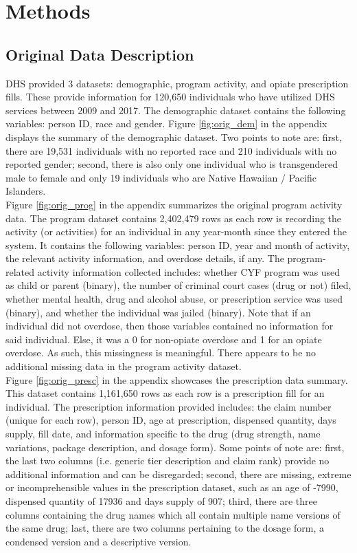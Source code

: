 \documentclass[twoside,10.5pt]{article}
\begin{document}
\section{Methods}
\subsection{Original Data Description}
DHS provided 3 datasets: demographic, program activity, and opiate prescription fills. These provide information for 120,650 individuals who have utilized DHS services between 2009 and 2017. The demographic dataset contains the following variables: person ID, race and gender. Figure \ref{fig:orig_dem} in the appendix displays the summary of the demographic dataset. Two points to note are: first, there are 19,531 individuals with no reported race and 210 individuals with no reported gender; second, there is also only one individual who is transgendered male to female and only 19 individuals who are Native Hawaiian / Pacific Islanders. \\

Figure \ref{fig:orig_prog} in the appendix summarizes the original program activity data. The program dataset contains 2,402,479 rows as each row is recording the activity (or activities) for an individual in any year-month since they entered the system. It contains the following variables: person ID, year and month of activity, the relevant activity information, and overdose details, if any. The program-related activity information collected includes: whether CYF program was used as child or parent (binary), the number of criminal court cases (drug or not) filed, whether mental health, drug and alcohol abuse, or prescription service was used (binary), and whether the individual was jailed (binary). Note that if an individual did not overdose, then those variables contained no information for said individual. Else, it was a 0 for non-opiate overdose and 1 for an opiate overdose. As such, this missingness is meaningful. There appears to be no additional missing data in the program activity dataset. \\

Figure \ref{fig:orig_presc} in the appendix showcases the prescription data summary. This dataset contains 1,161,650 rows as each row is a prescription fill for an individual. The prescription information provided includes: the claim number (unique for each row), person ID, age at prescription, dispensed quantity, days supply, fill date, and information specific to the drug (drug strength, name variations, package description, and dosage form). Some points of note are: first, the last two columns (i.e. generic tier description and claim rank) provide no additional information and can be disregarded; second, there are missing, extreme or incomprehensible values in the prescription dataset, such as an age of -7990, dispensed quantity of 17936 and days supply of 907; third, there are three columns containing the drug names which all contain multiple name versions of the same drug; last, there are two columns pertaining to the dosage form, a condensed version and a descriptive version.
\end{document}
